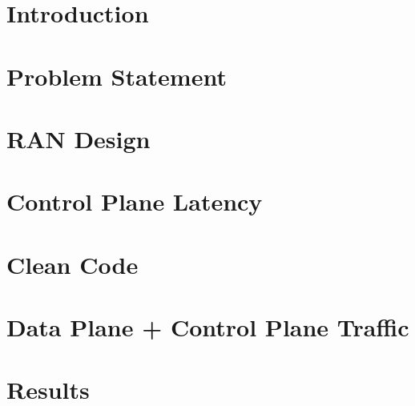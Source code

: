 \documentclass[a4paper,12pt]{report}
\renewcommand{\headrulewidth}{0pt}
\begin{document}
\fancyfoot[CO]{\thepage}

\newpage
\setcounter{page}{3}
% 
% 	
% 
\tableofcontents
\listoffigures
\newpage
{}
\fancyhead[RO]{\thepage}
\fancyhead[LO]{\slshape \leftmark}
\fancyfoot[CO]{}
\renewcommand{\headrulewidth}{0.5pt}

\chapter{Introduction \label{chap:Introduction}}


\chapter{Problem Statement \label{chap:ProblemStatement}}


\chapter{RAN Design\label{chap:RANDesign}}


\chapter{Control Plane Latency\label{chap:CPLatency}}


\chapter{Clean Code\label{chap:CleanCode}}


\chapter{Data Plane + Control Plane Traffic\label{chap:CPDPTraffic}}


\chapter{Results\label{chap:Results}}




\begin{spacing}{1}


\end{spacing}
\end{document}
